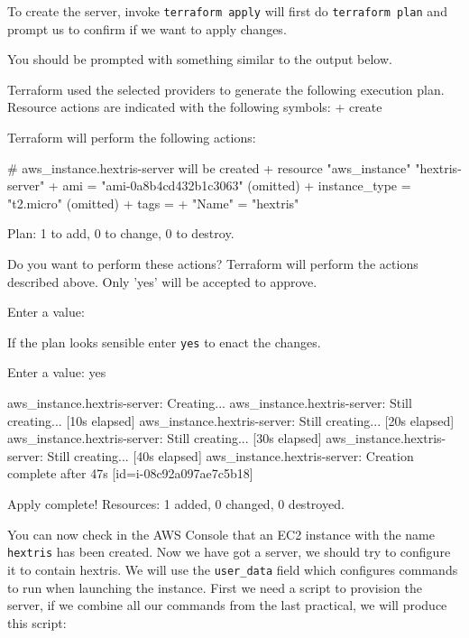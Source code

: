 \documentclass{csse4400}
\begin{document}
To create the server, invoke
\texttt{terraform apply} will first do \texttt{terraform plan} and prompt us to confirm if we want to apply changes.


You should be prompted with something similar to the output below.

\begin{code}[language=terraform-plan]{}
Terraform used the selected providers to generate the following execution plan. Resource actions are indicated with the following symbols:
  + create

Terraform will perform the following actions:

  # aws_instance.hextris-server will be created
  + resource "aws_instance" "hextris-server" {
      + ami                                  = "ami-0a8b4cd432b1c3063"
      (omitted)
      + instance_type                        = "t2.micro"
      (omitted)
      + tags                                 = {
          + "Name" = "hextris"
        }
    }

Plan: 1 to add, 0 to change, 0 to destroy.

Do you want to perform these actions?
  Terraform will perform the actions described above.
  Only 'yes' will be accepted to approve.

  Enter a value: 
\end{code}

If the plan looks sensible enter \texttt{yes} to enact the changes.

\begin{code}[language=terraform-plan]{}
  Enter a value: yes

aws_instance.hextris-server: Creating...
aws_instance.hextris-server: Still creating... [10s elapsed]
aws_instance.hextris-server: Still creating... [20s elapsed]
aws_instance.hextris-server: Still creating... [30s elapsed]
aws_instance.hextris-server: Still creating... [40s elapsed]
aws_instance.hextris-server: Creation complete after 47s [id=i-08c92a097ae7c5b18]

Apply complete! Resources: 1 added, 0 changed, 0 destroyed.
\end{code}

You can now check in the AWS Console that an EC2 instance with the name \texttt{hextris} has been created.
Now we have got a server, we should try to configure it to contain hextris.
We will use the \texttt{user\_data} field which configures commands to run when launching the instance.
First we need a script to provision the server, if we combine all our commands from the last practical, we will produce this script:
\end{document}

